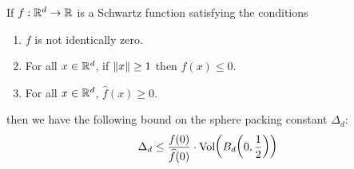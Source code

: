 \begin{boxtheorem}\label{SP:Thm:CohnElkies} %
    If $f : \mathbb{R}^d \to \mathbb{R}$ is a Schwartz function satisfying the conditions
    \begin{enumerate}[label = \normalfont(CE\arabic*)]
        \item\label{CE1} $f$ is not identically zero.
        \item\label{CE2} For all $x \in \mathbb{R}^d$, if $\left\lVert x \right\rVert \geq 1$ then $f(x) \leq 0$.
        \item\label{CE3} For all $x \in \mathbb{R}^d$, $\hat{f}(x) \geq 0$.
    \end{enumerate}
    then we have the following bound on the sphere packing constant $\Delta_d$:
    \begin{align*}
        \Delta_d \leq \frac{f(0)}{\widehat{f}(0)} \cdot \operatorname{Vol}\!\left( B_d\!\left( 0, \frac{1}{2} \right) \right)
    \end{align*}
\end{boxtheorem}
